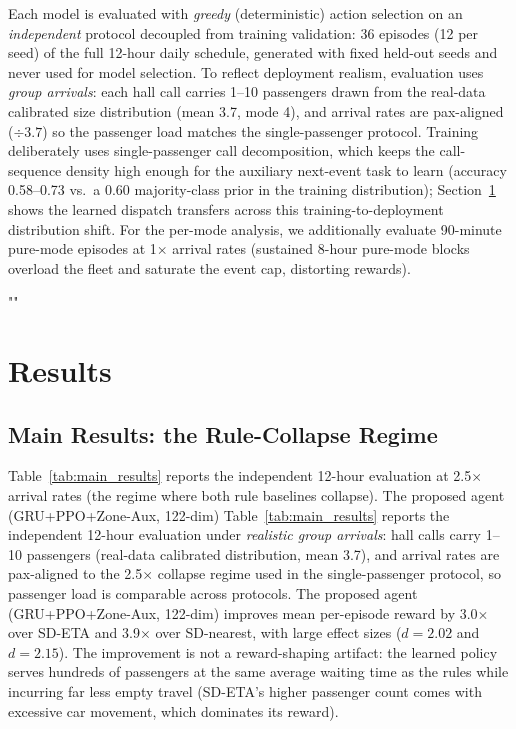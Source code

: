 \documentclass[conference]{IEEEtran}
\begin{document}
Each model is evaluated with \emph{greedy} (deterministic) action
selection on an \emph{independent} protocol decoupled from training
validation: 36 episodes (12 per seed) of the full 12-hour daily
schedule, generated with fixed held-out seeds and never used for
model selection. To reflect deployment realism, evaluation uses
\emph{group arrivals}: each hall call carries 1--10 passengers drawn
from the real-data calibrated size distribution (mean 3.7, mode 4),
and arrival rates are pax-aligned ($\div 3.7$) so the passenger load
matches the single-passenger protocol. Training deliberately uses
single-passenger call decomposition, which keeps the call-sequence
density high enough for the auxiliary next-event task to learn
(accuracy 0.58--0.73 vs.~a 0.60 majority-class prior in the
training distribution); Section~\ref{sec:results}
shows the learned dispatch transfers across this
training-to-deployment distribution shift.
For the per-mode analysis, we additionally evaluate 90-minute
pure-mode episodes at 1$\times$ arrival rates (sustained 8-hour
pure-mode blocks overload the fleet and saturate the event cap,
distorting rewards).

""\\\section{Results}
\label{sec:results}

\subsection{Main Results: the Rule-Collapse Regime}

Table~\ref{tab:main_results} reports the independent 12-hour
evaluation at 2.5$\times$ arrival rates (the regime where both rule
baselines collapse). The proposed agent (GRU+PPO+Zone-Aux, 122-dim)
Table~\ref{tab:main_results} reports the independent 12-hour
evaluation under \emph{realistic group arrivals}: hall calls carry
1--10 passengers (real-data calibrated distribution, mean 3.7), and
arrival rates are pax-aligned to the 2.5$\times$ collapse regime used
in the single-passenger protocol, so passenger load is comparable
across protocols. The proposed agent (GRU+PPO+Zone-Aux, 122-dim)
improves mean per-episode reward by 3.0$\times$ over SD-ETA and
3.9$\times$ over SD-nearest, with large effect sizes ($d = 2.02$ and
$d = 2.15$). The improvement is not a reward-shaping artifact: the
learned policy serves hundreds of passengers at the same average
waiting time as the rules while incurring far less empty travel
(SD-ETA's higher passenger count comes with excessive car movement,
which dominates its reward).
\end{document}
